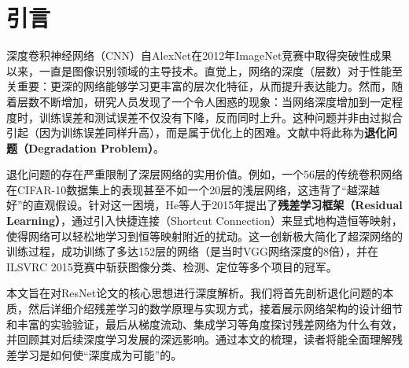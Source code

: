 \section{引言}

深度卷积神经网络（CNN）自AlexNet在2012年ImageNet竞赛中取得突破性成果以来，一直是图像识别领域的主导技术。直觉上，网络的深度（层数）对于性能至关重要：更深的网络能够学习更丰富的层次化特征，从而提升表达能力。然而，随着层数不断增加，研究人员发现了一个令人困惑的现象：当网络深度增加到一定程度时，训练误差和测试误差不仅没有下降，反而同时上升。这种问题并非由过拟合引起（因为训练误差同样升高），而是属于优化上的困难。文献中将此称为\textbf{退化问题（Degradation Problem）}。

退化问题的存在严重限制了深层网络的实用价值。例如，一个56层的传统卷积网络在CIFAR-10数据集上的表现甚至不如一个20层的浅层网络，这违背了“越深越好”的直观假设。针对这一困境，He等人于2015年提出了\textbf{残差学习框架（Residual Learning）}，通过引入快捷连接（Shortcut Connection）来显式地构造恒等映射，使得网络可以轻松地学习到恒等映射附近的扰动。这一创新极大简化了超深网络的训练过程，成功训练了多达152层的网络（是当时VGG网络深度的8倍），并在ILSVRC 2015竞赛中斩获图像分类、检测、定位等多个项目的冠军。

本文旨在对ResNet论文的核心思想进行深度解析。我们将首先剖析退化问题的本质，然后详细介绍残差学习的数学原理与实现方式，接着展示网络架构的设计细节和丰富的实验验证，最后从梯度流动、集成学习等角度探讨残差网络为什么有效，并回顾其对后续深度学习发展的深远影响。通过本文的梳理，读者将能全面理解残差学习是如何使“深度成为可能”的。